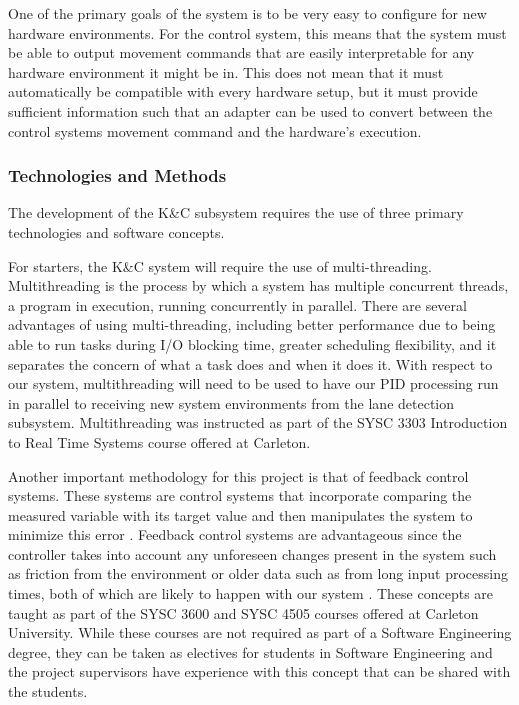 \documentclass[titlepage,draft]{article}
\begin{document}
{\begin{itemize}
	      One of the primary goals of the system is to be very easy to configure for new hardware environments. For the control system, this means that the system must be able to output movement commands that are easily interpretable for any hardware environment it might be in. This does not mean that it must automatically be compatible with every hardware setup, but it must provide sufficient information such that an adapter can be used to convert between the control systems movement command and the hardware's execution.
\end{itemize}


\subsubsection{Technologies and Methods}
The development of the K\&C subsystem requires the use of three primary technologies and software concepts.

For starters, the K\&C system will require the use of multi-threading. Multithreading is the process by which a system has multiple concurrent threads, a program in execution, running concurrently in parallel. There are several advantages of using multi-threading, including better performance due to being able to run tasks during I/O blocking time, greater scheduling flexibility, and it separates the concern of what a task does and when it does it. With respect to our system, multithreading will need to be used to have our PID processing run in parallel to receiving new system environments from the lane detection subsystem. Multithreading was instructed as part of the SYSC 3303 Introduction to Real Time Systems course offered at Carleton.

Another important methodology for this project is that of feedback control systems. These systems are control systems that incorporate comparing the measured variable with its target value and then manipulates the system to minimize this error \cite{intro_to_feedback_sys}. Feedback control systems are advantageous since the controller takes into account any unforeseen changes present in the system such as friction from the environment or older data such as from long input processing times, both of which are likely to happen with our system \cite{intro_to_feedback_sys}. These concepts are taught as part of the SYSC 3600 and SYSC 4505 courses offered at Carleton University. While these courses are not required as part of a Software Engineering degree, they can be taken as electives for students in Software Engineering and the project supervisors have experience with this concept that can be shared with the students.

}
\end{document}
